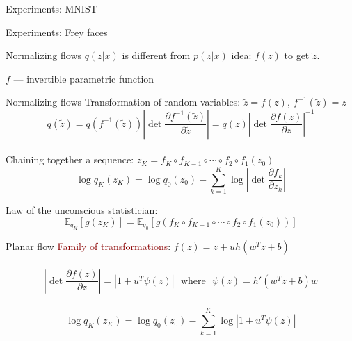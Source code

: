 \documentclass[unicode,11pt]{beamer}
\begin{document}
\begin{frame}{Experiments: MNIST}
\end{frame}


\begin{frame}{Experiments: Frey faces}
\end{frame}


\begin{frame}
  \centering\fontsize{24pt}{1em}\color{darkred}{\selectfont{What is wrong with VAE?}}
\end{frame}


\begin{frame}[fragile]{Normalizing flows}
  $q(z|x)$ is different from  $p(z|x)$
  idea: $f(z)$ to get $\tilde{z}$.

  $f$ --- invertible parametric function
\end{frame}

\begin{frame}[fragile]{Normalizing flows}
  Transformation of random variables: $\tilde{z} = f(z)$, $f^{-1}(\tilde{z}) = z$\\
  $$
  q(\tilde{z})
  = q(f^{-1}(\tilde{z})) \left\vert \det \frac{\partial f^{-1}(\tilde{z})}{\partial \tilde{z}} \right\vert
  = q(z) \left\vert \det \frac{\partial f(z)}{\partial z} \right\vert^{-1}
  $$ \\
  Chaining together a sequence: $z_K = f_K \circ f_{K−1} \circ \cdots \circ f_2 \circ f_1(z_0)$\\
  $$\log q_K(z_K) = \log q_0(z_0) − \sum_{k=1}^K \log \left\vert \det \frac{\partial f_k}{\partial z_k} \right\vert $$

  Law of the unconscious statistician:\\
  $$\mathbb{E}_{q_K} \left[g(z_K)\right] = \mathbb{E}_{q_0} \left[ g(f_K \circ f_{K−1} \circ \cdots \circ f_2
  \circ f_1(z_0)) \right] $$
\end{frame}

\begin{frame}[fragile]{Planar flow}
  \textcolor{darkred}{Family of transformations}: $f(z) = z + uh\left( w^T z + b \right)$\\
  ~\\
  $$\left\vert \det \frac{\partial f(z)}{\partial z} \right\vert = \left\vert 1 + u^T \psi(z)
  \right\vert ~~~\text{where}~~~ \psi(z) = h'(w^Tz + b)w$$ \\
  $$\log q_K(z_K) = \log q_0(z_0) − \sum_{k=1}^K \log \left\vert 1 + u^T \psi(z) \right\vert $$\\
  ~\\

\end{frame}
\end{document}
